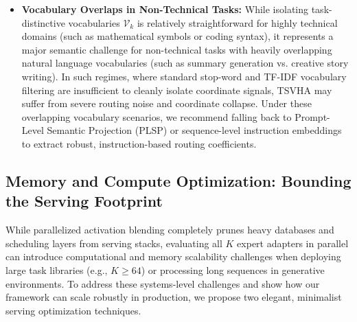 \begin{itemize}
  We openly and transparently disclose a fundamental physical boundary constraint under single-pass generative sequence serving: the \textbf{one-token physical routing lag}. Because the gating coefficients must be derived from penultimate representations $z_t$, the exact routing coordinates for a newly generated token $t$ are only available \emph{after} the full forward pass of token $t$ has already concluded. Consequently, the intermediate layer-wise blending of step $t$ must be executed using the routing weights computed from the previous token step $t-1$ (or earlier). At a sharp non-stationary transition boundary, this introduces a physical one-token detection lag: the first token of the new domain (token $t$) is necessarily executed using the outdated adapter weights of the old domain, before the representation spike can be physically detected to trigger the DGR and re-align the routing coefficients for token $t+1$. We frame this one-token lag as a fundamental physical limit of test-time sequence routing, and we empirically analyze its downstream impact on generation quality in Section~\ref{sec:lag_discussion}.
  \item \textbf{Vocabulary Overlaps in Non-Technical Tasks:} While isolating task-distinctive vocabularies $\mathcal{V}_k$ is relatively straightforward for highly technical domains (such as mathematical symbols or coding syntax), it represents a major semantic challenge for non-technical tasks with heavily overlapping natural language vocabularies (such as summary generation vs. creative story writing). In such regimes, where standard stop-word and TF-IDF vocabulary filtering are insufficient to cleanly isolate coordinate signals, TSVHA may suffer from severe routing noise and coordinate collapse. Under these overlapping vocabulary scenarios, we recommend falling back to Prompt-Level Semantic Projection (PLSP) or sequence-level instruction embeddings to extract robust, instruction-based routing coefficients.
\end{itemize}

\subsection{Memory and Compute Optimization: Bounding the Serving Footprint}
\label{sec:optimization}

While parallelized activation blending completely prunes heavy databases and scheduling layers from serving stacks, evaluating all $K$ expert adapters in parallel can introduce computational and memory scalability challenges when deploying large task libraries (e.g., $K \ge 64$) or processing long sequences in generative environments. To address these systems-level challenges and show how our framework can scale robustly in production, we propose two elegant, minimalist serving optimization techniques.

